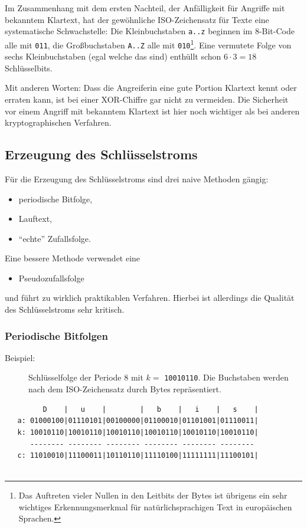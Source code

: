 \begin{refsegment}
Im Zusammenhang mit dem ersten Nachteil, der Anfälligkeit für Angriffe
mit bekanntem Klartext,
hat der gewöhnliche ISO-Zeichensatz
für Texte eine systematische Schwachstelle: Die Kleinbuchstaben {\tt a..z}
beginnen im 8-Bit-Code alle mit {\tt 011}, die Großbuchstaben {\tt A..Z}
alle mit {\tt 010}\footnote{%
  Das Auftreten vieler Nullen in den Leitbits der Bytes ist übrigens ein
  sehr wichtiges Erkennungsmerkmal für natürlichsprachigen Text in
  europäischen Sprachen.
}. Eine vermutete Folge von sechs Kleinbuchstaben (egal welche das sind)
enthüllt schon $6\cdot 3 = 18$ Schlüsselbits.

Mit anderen Worten: Dass die Angreiferin eine gute Portion Klartext
kennt oder erraten kann, ist bei einer XOR-Chiffre gar nicht zu vermeiden.
Die Sicherheit vor einem Angriff mit bekanntem Klartext ist hier noch
wichtiger als bei anderen kryptographischen Verfahren.

\subsection{Erzeugung des Schlüsselstroms}\label{ss-bool-keystream}

Für die Erzeugung des Schlüsselstroms sind
drei naive Methoden gängig:
\begin{itemize}
   \item periodische Bitfolge,
   \item Lauftext,
   \item "`echte"' Zufallsfolge.
\end{itemize}
Eine bessere Methode verwendet eine
\begin{itemize}
   \item Pseudozufallsfolge
\end{itemize}
und führt zu wirklich praktikablen Verfahren.
Hierbei ist allerdings die Qualität des Schlüsselstroms sehr kritisch.

\subsubsection*{Periodische Bitfolgen}

\begin{description}
\item[Beispiel:] Schlüsselfolge der Periode $8$ mit $k =$ {\tt 10010110}.
   Die Buchstaben werden nach dem ISO-Zeichensatz
   durch Bytes repräsentiert.
\end{description}
\begin{verbatim}
         D    |   u    |        |   b    |   i    |   s    |
   a: 01000100|01110101|00100000|01100010|01101001|01110011|
   k: 10010110|10010110|10010110|10010110|10010110|10010110|
      -------- -------- -------- -------- -------- --------
   c: 11010010|11100011|10110110|11110100|11111111|11100101|


\end{verbatim}
\end{refsegment}
